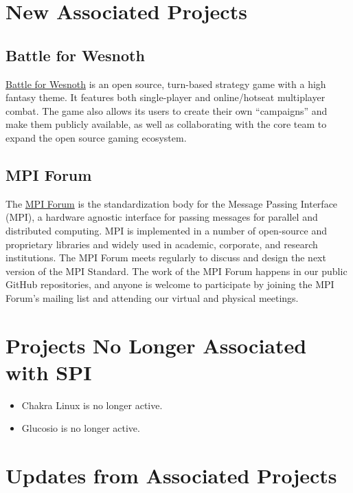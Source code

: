 \documentclass[a4paper]{report}
\begin{document}
\section{New Associated Projects}

\subsection{Battle for Wesnoth}

\href{https://www.wesnoth.org/}{Battle for Wesnoth} is an open source, turn-based strategy game with a high fantasy theme. It features both single-player and online/hotseat multiplayer combat. The game also allows its users to create their own ``campaigns'' and make them publicly available, as well as collaborating with the core team to expand the open source gaming ecosystem.

\subsection{MPI Forum}

The \href{https://www.mpi-forum.org/}{MPI Forum} is the standardization body for the Message Passing Interface (MPI), a hardware agnostic interface for passing messages for parallel and distributed computing. MPI is implemented in a number of open-source and proprietary libraries and widely used in academic, corporate, and research institutions. The MPI Forum meets regularly to discuss and design the next version of the MPI Standard. The work of the MPI Forum happens in our public GitHub repositories, and anyone is welcome to participate by joining the MPI Forum's mailing list and attending our virtual and physical meetings.

\section{Projects No Longer Associated with SPI}

\begin{itemize}

\item Chakra Linux is no longer active.

\item Glucosio is no longer active.

\end{itemize}

\section{Updates from Associated Projects}
\end{document}
